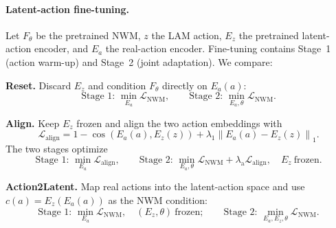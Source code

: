 \documentclass{article}
\begin{document}
\paragraph{Latent-action fine-tuning.}
Let $F_{\theta}$ be the pretrained NWM, $z$ the LAM action, $E_z$ the
pretrained latent-action encoder, and $E_a$ the real-action encoder. Fine-tuning
contains Stage~1 (action warm-up) and Stage~2 (joint adaptation). We compare:

\noindent\textbf{Reset.}
Discard $E_z$ and condition $F_{\theta}$ directly on $E_a(a)$:
\begin{equation}
  \text{Stage 1: }\min_{E_a}\mathcal{L}_{\mathrm{NWM}},
  \qquad
  \text{Stage 2: }\min_{E_a,\theta}\mathcal{L}_{\mathrm{NWM}}.
  \label{eq:reset}
\end{equation}

\noindent\textbf{Align.}
Keep $E_z$ frozen and align the two action embeddings with
\begin{equation}
  \mathcal{L}_{\mathrm{align}}
  = 1-\cos\!\left(E_a(a),E_z(z)\right)
  + \lambda_1\left\lVert E_a(a)-E_z(z)\right\rVert_1 .
  \label{eq:alignment_loss}
\end{equation}
The two stages optimize
\begin{equation}
  \text{Stage 1: }\min_{E_a}\mathcal{L}_{\mathrm{align}},
  \qquad
  \text{Stage 2: }\min_{E_a,\theta}
  \mathcal{L}_{\mathrm{NWM}}+\lambda_{\mathrm{a}}\mathcal{L}_{\mathrm{align}},
  \quad E_z\ \text{frozen}.
  \label{eq:align}
\end{equation}

\noindent\textbf{Action2Latent.}
Map real actions into the latent-action space and use
$c(a)=E_z(E_a(a))$ as the NWM condition:
\begin{equation}
  \text{Stage 1: }\min_{E_a}\mathcal{L}_{\mathrm{NWM}},
  \quad (E_z,\theta)\ \text{frozen};
  \qquad
  \text{Stage 2: }\min_{E_a,E_z,\theta}\mathcal{L}_{\mathrm{NWM}}.
  \label{eq:action2latent}
\end{equation}
\end{document}
